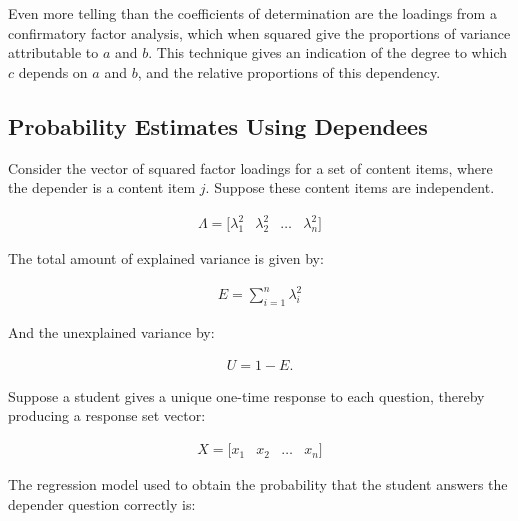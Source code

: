 
Even more telling than the coefficients of determination are the loadings from
a confirmatory factor analysis, which when squared give the proportions of
variance attributable to $a$ and $b$.  This technique gives an indication of
the degree to which $c$ depends on $a$ and $b$, and the relative proportions of
this dependency.


\subsection{Probability Estimates Using Dependees}

Consider the vector of squared factor loadings for a set of content items,
where the depender is a content item $j$.  Suppose these content items are
independent.

\begin{equation}
 \begin{array}{llll}
  \Lambda = \Big[ \lambda_1^2 & \lambda_2^2 & \ldots & \lambda_n^2 \Big]
 \end{array}
\end{equation}

The total amount of explained variance is given by:

\begin{equation}
 \begin{array}{llll}
  E = \displaystyle\sum_{i=1}^n \lambda_i^2
 \end{array}
\end{equation}

And the unexplained variance by:

\begin{equation}
 \begin{array}{llll}
  U = 1 - E.
 \end{array}
\end{equation}

Suppose a student gives a unique one-time response to each question, thereby 
producing a response set vector:

\begin{equation}
 \begin{array}{llll}
  X = \Big[ x_1 & x_2 & \ldots & x_n \Big]
 \end{array}
\end{equation}

The regression model used to obtain the probability that the student answers
the depender question correctly is:

